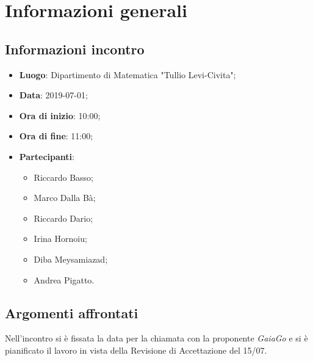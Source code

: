 \section{Informazioni generali}

\subsection{Informazioni incontro}
\begin{itemize}
	\item \textbf{Luogo}: Dipartimento di Matematica "Tullio Levi-Civita";
	\item \textbf{Data}: 2019-07-01;
	\item \textbf{Ora di inizio}: 10:00;
	\item \textbf{Ora di fine}: 11:00;
	\item \textbf{Partecipanti}: 
	\begin{itemize}
		\item Riccardo Basso;
		\item Marco Dalla Bà;
		\item Riccardo Dario;
		\item Irina Hornoiu;
		\item Diba Meysamiazad;
		\item Andrea Pigatto.	
	\end{itemize}
\end{itemize}

\subsection{Argomenti affrontati}
Nell'incontro si è fissata la data per la chiamata con la proponente \textit{GaiaGo} e si è pianificato il lavoro in vista della Revisione di Accettazione del 15/07.

